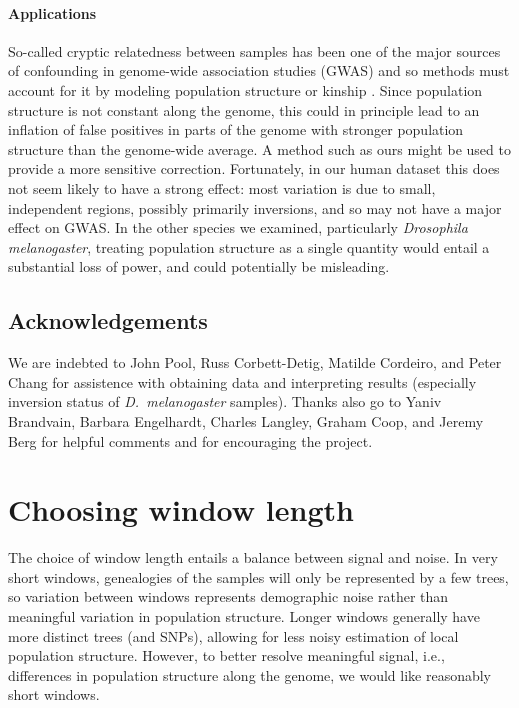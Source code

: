 \documentclass[11pt, oneside]{article}   	%
\begin{document}
\paragraph{Applications}
So-called cryptic relatedness between samples
has been one of the major sources of confounding in genome-wide association studies (GWAS)
and so methods must account for it by modeling population structure or kinship \citep{astle2009population,yang2014advantages}.
Since population structure is not constant along the genome,
this could in principle lead to an inflation of false positives in parts of the genome
with stronger population structure than the genome-wide average.
A method such as ours might be used to provide a more sensitive correction.
Fortunately, in our human dataset this does not seem likely to have a strong effect:
most variation is due to small, independent regions, possibly primarily inversions,
and so may not have a major effect on GWAS.
In the other species we examined, particularly \textit{Drosophila melanogaster},
treating population structure as a single quantity would entail a substantial loss of power,
and could potentially be misleading.

\subsection*{Acknowledgements}

We are indebted to John Pool, Russ Corbett-Detig, Matilde Cordeiro, and Peter Chang 
for assistence with obtaining data and interpreting results
(especially inversion status of \textit{D.~melanogaster} samples).
Thanks also go to Yaniv Brandvain, Barbara Engelhardt, Charles Langley, Graham Coop, and Jeremy Berg for helpful comments
and for encouraging the project.


  

\appendix
\setcounter{table}{0}
\renewcommand{\thetable}{S\arabic{table}}
\setcounter{figure}{0}
\renewcommand{\thefigure}{S\arabic{figure}}


\section{Choosing window length}
\label{apx:window_length}

The choice of window length entails a balance between signal and noise.
In very short windows, genealogies of the samples will only be represented by a few trees,
so variation between windows represents demographic noise rather than meaningful variation in population structure.
Longer windows generally have more distinct trees (and SNPs), 
allowing for less noisy estimation of local population structure.
However, to better resolve meaningful signal, i.e., differences in population structure along the genome,
we would like reasonably short windows.
\end{document}
